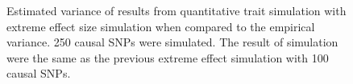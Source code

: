 \begin{figure}
{				
				\label{fig:ldscInQtEx250cVarCom}
			}
			\caption[Quantitative Trait with Extreme Effect Size Simulation Result(250 causal SNPs, Estimated Variance)]
			{Estimated variance of results from quantitative trait simulation with extreme effect size simulation when compared to the empirical variance.
				250 causal \glspl{SNP} were simulated.
				The result of simulation were the same as the previous extreme effect simulation with 100 causal \glspl{SNP}.
			} 
			\label{fig:QtEx250cVarCom}
		\end{figure}